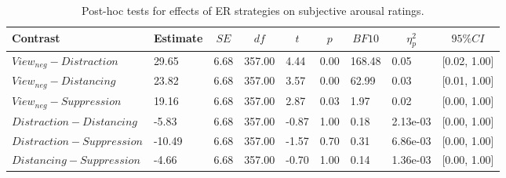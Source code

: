 \documentclass[
  man,floatsintext]{apa6}
\begin{document}
\begin{table}[H]

\begin{center}
\begin{threeparttable}

\caption{\label{tab:SupplEffectER}Post-hoc tests for effects of ER strategies on subjective arousal ratings.}

\footnotesize{

\begin{tabular}{lllllllll}
\toprule
Contrast & \multicolumn{1}{c}{Estimate} & \multicolumn{1}{c}{$SE$} & \multicolumn{1}{c}{$df$} & \multicolumn{1}{c}{$t$} & \multicolumn{1}{c}{$p$} & \multicolumn{1}{c}{$BF10$} & \multicolumn{1}{c}{$\eta_{p}^{2}$} & \multicolumn{1}{c}{$95\% CI$}\\
\midrule
$View_{neg} - Distraction$ & 29.65 & 6.68 & 357.00 & 4.44 & 0.00 & 168.48 & 0.05 & {}[0.02, 1.00]\\
$View_{neg} - Distancing$ & 23.82 & 6.68 & 357.00 & 3.57 & 0.00 & 62.99 & 0.03 & {}[0.01, 1.00]\\
$View_{neg} - Suppression$ & 19.16 & 6.68 & 357.00 & 2.87 & 0.03 & 1.97 & 0.02 & {}[0.00, 1.00]\\
$Distraction - Distancing$ & -5.83 & 6.68 & 357.00 & -0.87 & 1.00 & 0.18 & 2.13e-03 & {}[0.00, 1.00]\\
$Distraction - Suppression$ & -10.49 & 6.68 & 357.00 & -1.57 & 0.70 & 0.31 & 6.86e-03 & {}[0.00, 1.00]\\
$Distancing - Suppression$ & -4.66 & 6.68 & 357.00 & -0.70 & 1.00 & 0.14 & 1.36e-03 & {}[0.00, 1.00]\\
\bottomrule
\end{tabular}

}

\end{threeparttable}
\end{center}

\end{table}
\end{document}

